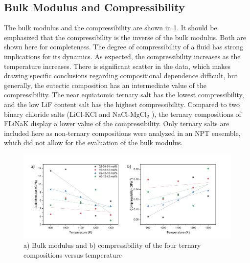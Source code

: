 \documentclass[preprint,12pt]{elsarticle}
\begin{document}

\FloatBarrier

\subsection{Bulk Modulus and Compressibility}

The bulk modulus and the compressibility are shown in \cref{fig:bulkCompress}. It should be emphasized that the compressibility is the inverse of the bulk modulus. Both are shown here for completeness. The degree of compressibility of a fluid has strong implications for its dynamics. As expected, the compressibility increases as the temperature increases. There is significant scatter in the data, which makes drawing specific conclusions regarding compositional dependence difficult, but generally, the eutectic composition has an intermediate value of the compressibility. The near equiatomic ternary salt has the lowest compressibility, and the low LiF content salt has the highest compressibility. Compared to two binary chloride salts (LiCl-KCl \cite{Duemmler2022} and NaCl-MgCl$_2$ \cite{Duemmler2022b}), the ternary compositions of FLiNaK display a lower value of the compressibility. Only ternary salts are included here as non-ternary compositions were analyzed in an NPT ensemble, which did not allow for the evaluation of the bulk modulus. 

\begin{figure}[!ht]
    \centering
    \includegraphics[width=\textwidth]{BulkCompress_2.jpg}
    \caption{a) Bulk modulus and b) compressibility of the four ternary compositions versus temperature}
    \label{fig:bulkCompress}
\end{figure}
\FloatBarrier
\end{document}
